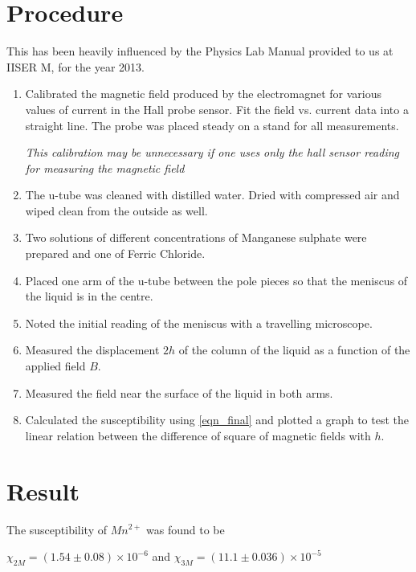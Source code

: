 \section{Procedure}
	This has been heavily influenced by the Physics Lab Manual provided to us at IISER M, for the year 2013.
		\begin{enumerate}
			\item Calibrated the magnetic field produced by the electromagnet for various values of current in the Hall probe sensor. Fit the field vs. current data into a straight line. The probe was placed steady on a stand for all measurements.
			\par
			\emph{This calibration may be unnecessary if one uses only the hall sensor reading for measuring the magnetic field}
			\item The u-tube was cleaned with distilled water. Dried with compressed air and wiped clean from the outside as well.
			\item Two solutions of different concentrations of Manganese sulphate were prepared and one of Ferric Chloride.
			\item Placed one arm of the u-tube between the pole pieces so that the meniscus of the liquid is in the centre.
			\item Noted the initial reading of the meniscus with a travelling microscope.
			\item Measured the displacement $2h$ of the column of the liquid as a function of the applied field $B$.
			\item Measured the field near the surface of the liquid in both arms.
			\item Calculated the susceptibility using \autoref{eqn_final} and plotted a graph to test the linear relation between the difference of square of magnetic fields with $h$.
		\end{enumerate}

\section{Result}
	The susceptibility of $Mn^{2+}$ was found to be
	\par
	$\chi_{2M}=(1.54 \pm 0.08) \times 10^{-6}$ and $\chi_{3M} = (11.1 \pm 0.036) \times 10^{-5}$